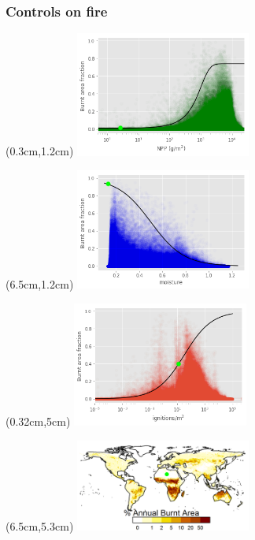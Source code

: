 \begin{frame}
	\frametitle{Controls on fire}
	\begin{textblock*}{14cm}(0.3cm,1.2cm)
		\includegraphics[width=5.78cm]{images/limitCurves/Desert/NPPVsFire}	
	\end{textblock*}
	\begin{textblock*}{14cm}(6.5cm,1.2cm)
		\includegraphics[width=5.78cm]{images/limitCurves/Desert/alphaVsFire}	
	\end{textblock*}
	\begin{textblock*}{14cm}(0.32cm,5cm)
		\includegraphics[width=5.78cm]{images/limitCurves/Desert/ignitionsVsFire.png}		
	\end{textblock*}
	\begin{textblock*}{14cm}(6.5cm,5.3cm)
		\includegraphics[width=5.78cm]{images/limitCurves/Desert/fireMap.png}		
	\end{textblock*}
\end{frame}



